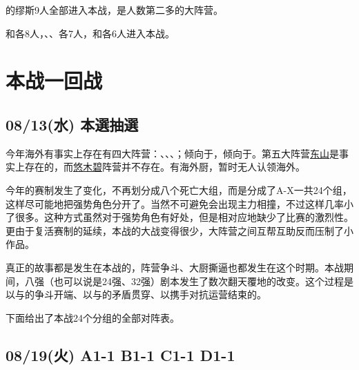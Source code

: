 的缪斯9人全部进入本战，是人数第二多的大阵营。

和各8人，、、各7人，和各6人进入本战。

\chapter{本战一回战}

\section{08/13(水) 本選抽選}

今年海外有事实上存在有四大阵营：、、、；倾向于，倾向于。第五大阵营\uline{东山}是事实上存在的，而\uline{悠木碧}阵营并不存在。有海外厨，暂时无人认领海外。

今年的赛制发生了变化，不再划分成八个死亡大组，而是分成了A-X一共24个组，这样尽可能地把强势角色分开了。当然不可避免会出现主力相撞，不过这样几率小了很多。这种方式虽然对于强势角色有好处，但是相对应地缺少了比赛的激烈性。更由于复活赛制的延续，本战的大战变得很少，大阵营之间互帮互助反而压制了小作品。

真正的故事都是发生在本战的，阵营争斗、大厨撕逼也都发生在这个时期。本战期间，八强（也可以说是24强、32强）剧本发生了数次翻天覆地的改变。这个过程是以与的争斗开端、以与的矛盾贯穿、以携手对抗运营结束的。

下面给出了本战24个分组的全部对阵表。



\section{08/19(火) A1-1 B1-1 C1-1 D1-1}

